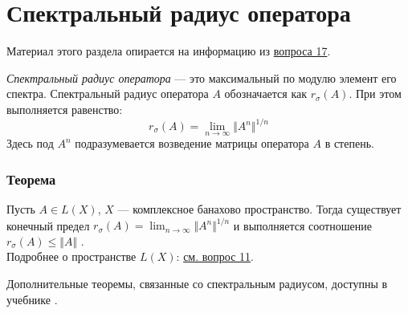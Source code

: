 \section{Спектральный радиус оператора}
Материал этого раздела опирается на информацию из \hyperref[sec:q-17]{вопроса 17}.

\textit{Спектральный радиус оператора} --- это максимальный по модулю элемент его спектра. Спектральный радиус оператора $A$ обозначается как $r_\sigma(A)$. При этом выполняется равенство:
$$r_\sigma(A) = \lim_{n \rightarrow \infty} \Vert A^n \Vert ^{1/n}$$
Здесь под $A^n$ подразумевается возведение матрицы оператора $A$ в степень.

\subsubsection*{Теорема}
Пусть $A\in L(X)$, $X$ --- комплексное банахово пространство. Тогда существует конечный предел $\displaystyle r_\sigma(A) = \lim_{n \rightarrow \infty} \Vert A^n \Vert ^{1/n}$ и выполняется соотношение $r_\sigma(A) \leqslant \Vert A \Vert$ \cite[с.~249]{trenogin}.\\
Подробнее о пространстве $L(X)$: \hyperref[sec:q-11]{см. вопрос 11}.

Дополнительные теоремы, связанные со спектральным радиусом, доступны в учебнике \cite[с.~249]{trenogin}.